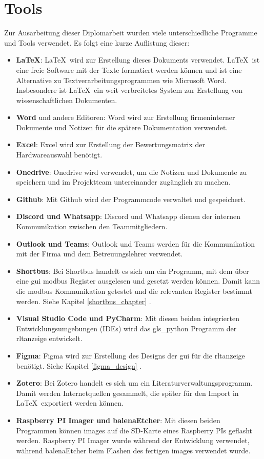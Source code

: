 \ifoot{\leftmark}
\chapter{Tools}
\noindent Zur Ausarbeitung dieser Diplomarbeit wurden viele unterschiedliche Programme und Tools verwendet. Es folgt eine kurze Auflistung dieser:
\begin{itemize}
	\item \textbf{\LaTeX}: \LaTeX \ wird zur Erstellung dieses Dokuments verwendet. \LaTeX \ ist eine freie Software mit der Texte formatiert werden können und ist eine Alternative zu Textverarbeitungsprogrammen wie Microsoft Word. Insbesondere ist \LaTeX \ ein weit verbreitetes System zur Erstellung von wissenschaftlichen Dokumenten. \cite[vgl.][]{latex_o.J.}
	\item \textbf{Word} und andere Editoren: Word wird zur Erstellung firmeninterner Dokumente und Notizen für die spätere Dokumentation verwendet.
	\item \textbf{Excel}: Excel wird zur Erstellung der Bewertungsmatrix der Hardwareauswahl benötigt.
	\item \textbf{Onedrive}: Onedrive wird verwendet, um die Notizen und Dokumente zu speichern und im Projektteam untereinander zugänglich zu machen.
	\item \textbf{Github}: Mit Github wird der Programmcode verwaltet und gespeichert.
	\item \textbf{Discord und Whatsapp}: Discord und Whatsapp dienen der internen Kommunikation zwischen den Teammitgliedern.
	\item \textbf{Outlook und Teams}: Outlook und Teams werden für die Kommunikation mit der Firma und dem Betreuungslehrer verwendet.
	\item \textbf{Shortbus}: Bei Shortbus handelt es sich um ein Programm, mit dem über eine \acs{gui} \gls{modbus} Register ausgelesen und gesetzt werden können. Damit kann die \gls{modbus} Kommunikation getestet und die relevanten Register bestimmt werden. Siehe Kapitel \ref{shortbus_chapter} .
	\item \textbf{Visual Studio Code und PyCharm}: Mit diesen beiden integrierten Entwicklungsumgebungen (IDEs) wird das \gls{gls_python} Programm der \ac{rltanzeige} entwickelt.
	\item \textbf{Figma}: Figma wird zur Erstellung des Designs \bzw der \ac{gui} für die \ac{rltanzeige} benötigt. Siehe Kapitel \ref{figma_design} .
	\item \textbf{Zotero}: Bei Zotero handelt es sich um ein Literaturverwaltungsprogramm. Damit werden Internetquellen gesammelt, die später für den Import in \LaTeX \ exportiert werden können.
    \item \textbf{Raspberry PI Imager und balenaEtcher}: Mit diesen beiden Programmen können \gls{image}s auf die SD-Karte eines Raspberry PIs geflasht werden. Raspberry PI Imager wurde während der Entwicklung verwendet, während balenaEtcher beim Flashen des fertigen \gls{image}s verwendet wurde.
\end{itemize}
